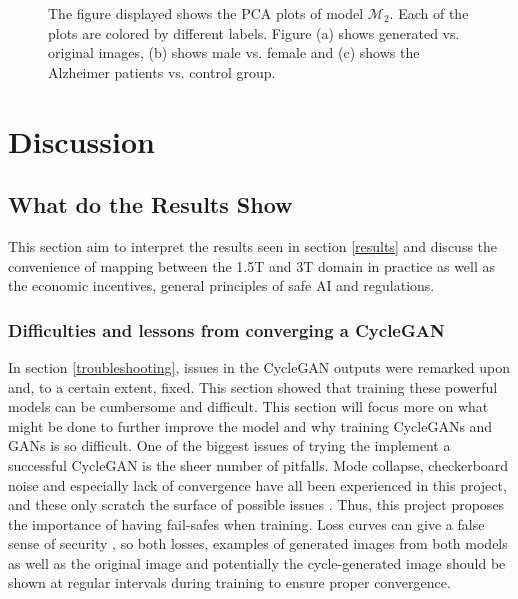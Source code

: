 \documentclass[11pt, fleqn, titlepage]{article}
\newcommand{\1}[1]{\mathds{1}\left[#1\right]}
\begin{document}
\begin{figure}[H]
	\caption{The figure displayed shows the PCA plots of model $ \mathcal M_2 $. Each of the plots are colored by different labels. Figure (a) shows generated vs. original images, (b) shows male vs. female and (c) shows the Alzheimer patients vs. control group. }
	\label{fig:pca_not_gen_overfit}
\end{figure}


\section{Discussion}\label{discussion}

\subsection{What do the Results Show}\label{discussionOfResults}
This section aim to interpret the results seen in section \ref{results} and discuss the convenience of mapping between the 1.5T and 3T domain in practice as well as the economic incentives, general principles of safe AI and regulations.

\subsubsection{Difficulties and lessons from converging a CycleGAN}
In section \ref{troubleshooting}, issues in the CycleGAN outputs were remarked upon and, to a certain extent, fixed. This section showed that training these powerful models can be cumbersome and difficult. This section will focus more on what might be done to further improve the model and why training CycleGANs and GANs is so difficult. One of the biggest issues of trying the implement a successful CycleGAN is the sheer number of pitfalls. Mode collapse, checkerboard noise and especially lack of convergence have all been experienced in this project, and these only scratch the surface of possible issues \cite{hard_to_train, mode_collapse_MLM}. Thus, this project proposes the importance of having fail-safes when training. Loss curves can give a false sense of security \cite{towardsdatascience_losses, better_cycles_losses}, so both losses, examples of generated images from both models as well as the original image and potentially the cycle-generated image should be shown at regular intervals during training to ensure proper convergence.
\end{document}

